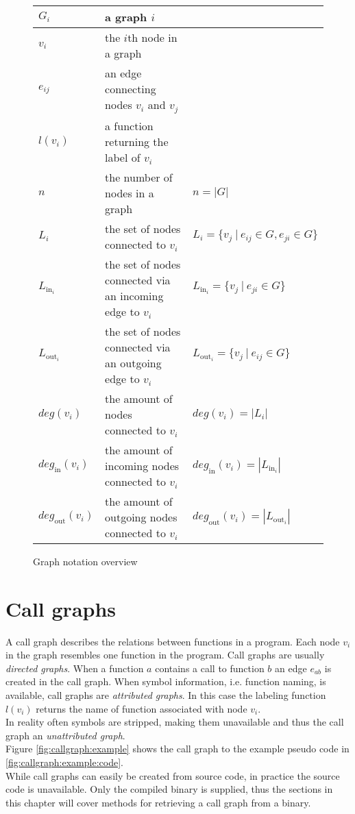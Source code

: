 \documentclass[
    12pt,                               %
    DIV=14,                     %
    parskip=half+,              %
    bigheadings,                %
    cleardoubleempty,   %
    halfparskip,                %
    ]{scrreprt} %
\begin{document}
\begin{figure}[H]
	\centering
	\begin{tabular}{l | l | l}
		$G_i$		& a graph $i$ & \\ \hline
		$v_i$		& the $i$th node in a graph \\ \hline
		$e_{ij}$	& an edge connecting nodes $v_i$ and $v_j$ \\ \hline
		$l(v_i)$	& a function returning the label of $v_i$ & \\ \hline
		$n$			& the number of nodes in a graph & $n = |G|$ \\ \hline
		$L_i$		& the set of nodes connected to $v_i$ & $L_i = \{v_j \: | \: e_{ij} \in G, e_{ji} \in G\}$ \\ \hline
		$L_{\text{in}_i}$ & the set of nodes connected via an incoming edge to $v_i$ & $L_{\text{in}_i} = \{v_j \: | \: e_{ji} \in G\}$ \\ \hline
		$L_{\text{out}_i}$ & the set of nodes connected via an outgoing edge to $v_i$ & $L_{\text{out}_i} = \{v_j \: | \: e_{ij} \in G\}$ \\ \hline
		$deg(v_i)$	& the amount of nodes connected to $v_i$ & $deg(v_i) = |L_i|$ \\ \hline
		$deg_{\text{in}}(v_i)$	& the amount of incoming nodes connected to $v_i$ & $deg_{\text{in}}(v_i) = |L_{\text{in}_i}|$ \\ \hline
		$deg_{\text{out}}(v_i)$	& the amount of outgoing nodes connected to $v_i$ & $deg_{\text{out}}(v_i) = |L_{\text{out}_i}|$ \\
	\end{tabular}
	\caption{Graph notation overview}
	\label{fig:notation}
\end{figure}

\chapter{Call graphs} \label{chap:graphacquisition}
A call graph describes the relations between functions in a program. Each node $v_i$ in the graph resembles one function in the program. Call graphs are usually \textit{directed graphs}. When a function $a$ contains a call to function $b$ an edge $e_{ab}$ is created in the call graph. When symbol information, i.e. function naming, is available, call graphs are \textit{attributed graphs}. In this case the labeling function $l(v_i)$ returns the name of function associated with node $v_i$. \\
In reality often symbols are stripped, making them unavailable and thus the call graph an \textit{unattributed graph}. \\
Figure \ref{fig:callgraph:example} shows the call graph to the example pseudo code in \ref{fig:callgraph:example:code}. \\
While call graphs can easily be created from source code, in practice the source code is unavailable. Only the compiled binary is supplied, thus the sections in this chapter will cover methods for retrieving a call graph from a binary.
\end{document}
